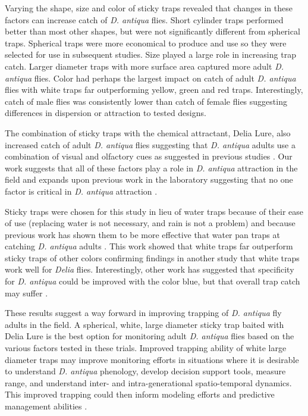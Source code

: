 \documentclass[alpha-refs]{wiley-article}
\begin{document}
Varying the shape, size and color of sticky traps revealed that changes in these factors can increase catch of \textit{D. antiqua} flies.  Short cylinder traps performed better than most other shapes, but were not significantly different from spherical traps.  Spherical traps were more economical to produce and use so they were selected for use in subsequent studies.  Size played a large role in increasing trap catch.  Larger diameter traps with more surface area captured more adult \textit{D. antiqua} flies.  Color had perhaps the largest impact on catch of adult \textit{D. antiqua} flies with white traps far outperforming yellow, green and red traps.  Interestingly, catch of male flies was consistently lower than catch of female flies suggesting differences in dispersion or attraction to tested designs.  

The combination of sticky traps with the chemical attractant, Delia Lure, also increased catch of adult \textit{D. antiqua} flies suggesting that \textit{D. antiqua} adults use a combination of visual and olfactory cues as suggested in previous studies \citep{harris1983color, harris1988host}.  Our work suggests that all of these factors play a role in \textit{D. antiqua} attraction in the field and expands upon previous work in the laboratory suggesting that no one factor is critical in \textit{D. antiqua} attraction \citep{harris1988host}.  

Sticky traps were chosen for this study in lieu of water traps because of their ease of use (replacing water is not necessary, and rain is not a problem) and because previous work has shown them to be more effective that water pan traps at catching \textit{D. antiqua} adults \citep{thomingdeveloping}.  This work showed that white traps far outperform sticky traps of other colors confirming findings in another study that white traps work well for \textit{Delia} flies.  Interestingly, other work has suggested that specificity for \textit{D. antiqua} could be improved with the color blue, but that overall trap catch may suffer \citep{thomingdeveloping}.   

These results suggest a way forward in improving trapping of \textit{D. antiqua} fly adults in the field. A spherical, white, large diameter sticky trap baited with Delia Lure is the best option for monitoring adult \textit{D. antiqua} flies based on the various factors tested in these trials. Improved trapping ability of white large diameter traps may improve monitoring efforts in situations where it is desirable to understand \textit{D. antiqua} phenology, develop decision support tools, measure range, and understand inter- and intra-generational spatio-temporal dynamics.  This improved trapping could then inform modeling efforts and predictive management abilities \citep{ning2017predicting, otto2000development,thomingdeveloping}.    
\end{document}
